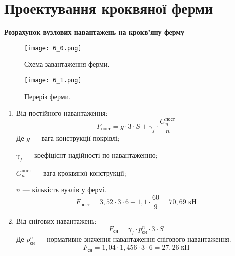 \documentclass[a4paper,14pt]{article}
\begin{document}
\section{Проектування кроквяної ферми}
\textbf{Розрахунок вузлових навантажень на крокв'яну ферму}
\begin{figure}[h!]
    \begin{center}
        \texttt{[image: 6\_0.png]}
        \caption{Схема завантаження ферми.}\label{ris6_0} 
    \end{center}
\end{figure}    
\begin{figure}[h!]
    \begin{center}
        \texttt{[image: 6\_1.png]}
        \caption{Переріз ферми.}\label{ris6_1} 
    \end{center}
\end{figure} 
\begin{enumerate}
    \item Від постійного навантаження:
        \begin{equation}
            F_{\textit{пост}} = g \cdot 3 \cdot S + \gamma_f \cdot \dfrac{G_n^{\textit{пост}}}{n}
        \end{equation}
        Де $g$ --- вага конструкції покрівлі;

        $\gamma_f$ --- коефіцієнт надійності по навантаженню;

        $G_n^{\textit{пост}}$ --- вага кроквяної конструкції;

        $n$ --- кількість вузлів у фермі.
        $$F_{\textit{пост}} = 3,52 \cdot 3 \cdot 6 + 1,1 \cdot \dfrac{60}{9} = 70,69\;\textit{кН}$$
    \item Від снігових навантажень:
        \begin{equation}
            F_{\textit{сн}} = \gamma_f \cdot p_{\textit{сн}}^n \cdot 3 \cdot S
        \end{equation}
        Де $p_{\textit{сн}}^n$ --- нормативне значення навантаження снігового навантаження.
        $$F_{\textit{сн}} = 1,04 \cdot 1,456 \cdot 3 \cdot 6 = 27,26\;\textit{кН}$$
\end{enumerate}
\end{document}
